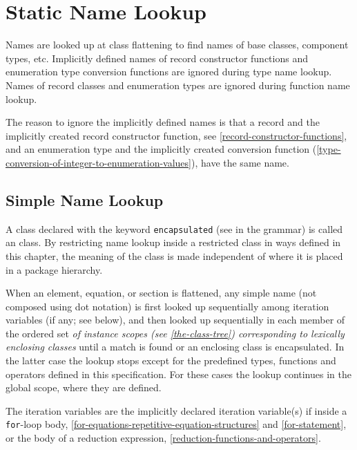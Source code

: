 \section{Static Name Lookup}\label{static-name-lookup}

Names are looked up at class flattening to find names of base classes, component types, etc.
Implicitly defined names of record constructor functions and enumeration type conversion functions are ignored during type name lookup.
Names of record classes and enumeration types are ignored during function name lookup.

\begin{nonnormative}
The reason to ignore the implicitly defined names is that a record and the implicitly created record constructor function, see \cref{record-constructor-functions}, and an enumeration type and the implicitly created conversion function (\cref{type-conversion-of-integer-to-enumeration-values}), have the same name.
\end{nonnormative}


\subsection{Simple Name Lookup}\label{simple-name-lookup}

A class declared with the keyword \lstinline!encapsulated! (see  in the grammar) is called an  class.
By restricting name lookup inside a restricted class in ways defined in this chapter, the meaning of the class is made independent of where it is placed in a package hierarchy.

When an element, equation, or section is flattened, any simple name (not composed using dot notation) is first looked up sequentially among iteration variables (if any; see below), and then looked up sequentially in each member of the ordered set \emph{of instance scopes (see \cref{the-class-tree}) corresponding to lexically enclosing classes} until a match is found or an enclosing class is encapsulated.
In the latter case the lookup stops except for the predefined types, functions and operators defined in this specification.
For these cases the lookup continues in the global scope, where they are defined.

The iteration variables are the implicitly declared iteration variable(s) if inside a \lstinline!for!-loop body, \cref{for-equations-repetitive-equation-structures} and \cref{for-statement}, or the body of a reduction expression, \cref{reduction-functions-and-operators}.

